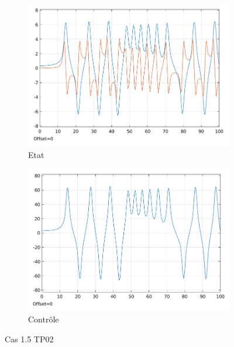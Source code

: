 \documentclass[a4paper]{article}
\begin{document}
                        \begin{figure}[h!]
                                \centering
                                \begin{subfigure}[b]{0.45\textwidth}
                                        \includegraphics[width=\textwidth]{images/courbe_cas_1_5_TP02.png}
                                        \caption{Etat}
                                        \label{fig_cas_1.5_TP02_etats}
                                \end{subfigure}
                                \hspace{30pt}
                                \begin{subfigure}[b]{0.45\textwidth}
                                        \includegraphics[width=\textwidth]{images/controle_cas_1_5_TP02.png}
                                        \caption{Contrôle}
                                        \label{fig_cas_1.5_TP02_controle}
                                \end{subfigure}
                                \caption{Cas 1.5 TP02}
                                \label{fig_cas_1.5_TP02}
                        \end{figure}
\end{document}
